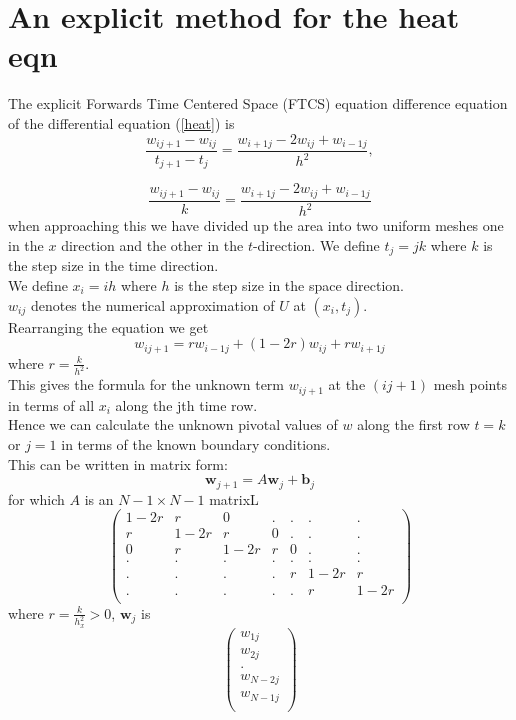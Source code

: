 \section{An explicit method for the heat eqn}
The explicit Forwards Time Centered Space (FTCS) equation difference equation of the differential equation (\ref{heat}) is
\begin{equation}
\frac{w_{ij+1}-w_{ij}}{t_{j+1}-t_{j}}=\frac{w_{i+1j}-2w_{ij}+w_{i-1j}}{h^2},
\end{equation}

\begin{equation*}
\frac{w_{ij+1}-w_{ij}}{k}=\frac{w_{i+1j}-2w_{ij}+w_{i-1j}}{h^2}
\end{equation*}
when approaching this we have divided up the area into
two uniform meshes one in the $x$ direction and the other in the $t$-direction.
We define $t_j=jk$ where $k$ is the step size in the time direction.\\
We define $x_i=ih$ where $h$ is the step size in the space direction.\\
$w_{ij}$ denotes the numerical approximation of $U$ at $(x_i,t_j)$.\\
Rearranging the equation we get
\begin{equation}\label{disc heat}
w_{ij+1}=rw_{i-1j}+(1-2r)w_{ij}+rw_{i+1j}
\end{equation}
where $r=\frac{k}{h^2}$.\\
This gives the formula for the unknown term $w_{ij+1}$ at the $(ij+1)$ mesh points
in terms of all $x_i$ along the jth time row.\\
Hence we can calculate the unknown pivotal values of $w$ along the first row $t=k$ or $j=1$ in terms of the known boundary conditions.\\
This can be written in  matrix form: 
\[ \mathbf{w}_{j+1}=A\mathbf{w}_{j} +\mathbf{b}_{j} \]
for which $A$ is an $N-1 \times N-1 $ matrixL
\[
\left(\begin{array}{ccccccc}
1-2r&r&0&.&.&.&.\\
r&1-2r&r&0&.&.&.\\
0&r&1-2r&r&0&.&.\\
.&.&.&.&.&.&.\\
.&.&.&.&r&1-2r&r\\
.&.&.&.&.&r&1-2r\\
\end{array}\right)
\]
where $r=\frac{k}{h_x^2}>0$, $\mathbf{w}_j$ is 
\[
\left(\begin{array}{c}
w_{1j}\\
w_{2j}\\
.\\
w_{N-2j}\\
w_{N-1j}\\

\end{array}\right)
\]
